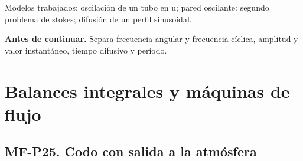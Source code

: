 \begin{tcolorbox}[studiumcheck,breakable=false,title={Síntesis y comprobación}]Modelos trabajados: oscilación de un tubo en u; pared oscilante: segundo problema de stokes; difusión de un perfil sinusoidal.\par\textbf{Antes de continuar.} Separa frecuencia angular y frecuencia cíclica, amplitud y valor instantáneo, tiempo difusivo y período.\end{tcolorbox}

\chapter{Balances integrales y máquinas de flujo}


\Needspace{.30\textheight}\section{MF-P25. Codo con salida a la atmósfera}

